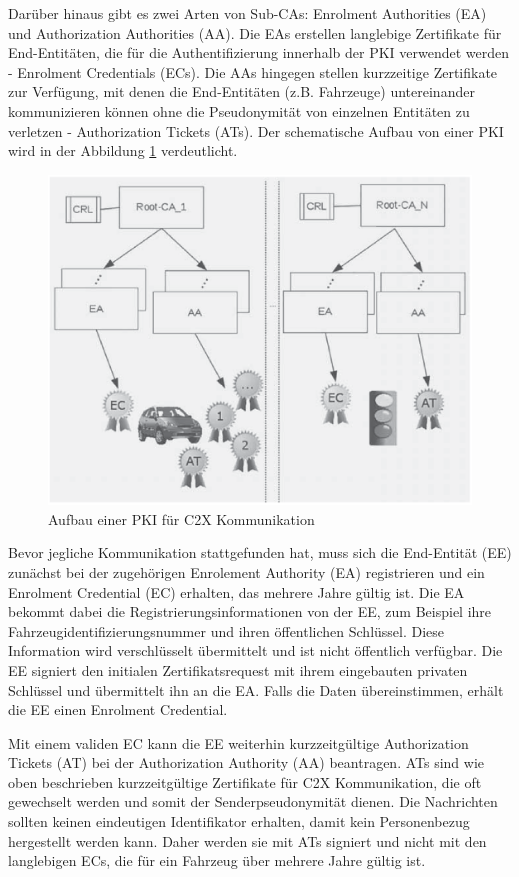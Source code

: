 Darüber hinaus gibt es zwei Arten von Sub-CAs: Enrolment Authorities (EA) und Authorization Authorities (AA). Die EAs erstellen langlebige Zertifikate für End-Entitäten, die für die Authentifizierung innerhalb der PKI verwendet werden - Enrolment Credentials (ECs). Die AAs hingegen stellen kurzzeitige Zertifikate zur Verfügung, mit denen die End-Entitäten (z.B. Fahrzeuge) untereinander kommunizieren können ohne die Pseudonymität von einzelnen Entitäten zu verletzen - Authorization Tickets (ATs). Der schematische Aufbau von einer PKI wird in der Abbildung \ref{fig:pki} verdeutlicht.

\begin{figure}
	\centering
	\includegraphics[width=0.7\linewidth]{images/PKI}
	\caption[Aufbau einer PKI für C2X Kommunikation]{Aufbau einer PKI für C2X Kommunikation \footnotemark}
	\label{fig:pki}
\end{figure}

Bevor jegliche Kommunikation stattgefunden hat, muss sich die End-Entität (EE) zunächst bei der zugehörigen Enrolement Authority (EA) registrieren und ein Enrolment Credential (EC) erhalten, das mehrere Jahre gültig ist. Die EA bekommt dabei die Registrierungsinformationen von der EE, zum Beispiel ihre Fahrzeugidentifizierungsnummer und ihren öffentlichen Schlüssel. Diese Information wird verschlüsselt übermittelt und ist nicht öffentlich verfügbar. Die EE signiert den initialen Zertifikatsrequest mit ihrem eingebauten privaten Schlüssel und übermittelt ihn an die EA. Falls die Daten übereinstimmen, erhält die EE einen Enrolment Credential.

Mit einem validen EC kann die EE weiterhin kurzzeitgültige Authorization Tickets (AT) bei der Authorization Authority (AA) beantragen. ATs sind wie oben beschrieben kurzzeitgültige Zertifikate für C2X Kommunikation, die oft gewechselt werden und somit der Senderpseudonymität dienen. Die Nachrichten sollten keinen eindeutigen Identifikator erhalten, damit kein Personenbezug hergestellt werden kann. Daher werden sie mit ATs signiert und nicht mit den langlebigen ECs, die für ein Fahrzeug über mehrere Jahre gültig ist. 

